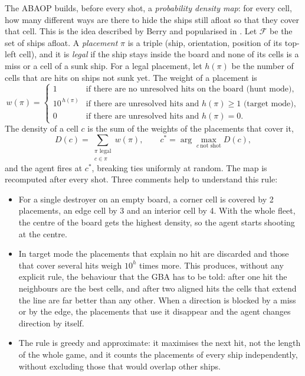 \documentclass[letterpaper,11pt]{article} %
\begin{document}
The ABAOP builds, before every shot, a \emph{probability density map}: for every cell, how many different ways are there to hide the ships still afloat so that they cover that cell.
This is the idea described by Berry \cite{berry2011} and popularised in \cite{vsauce2019,schwartz2022}.
Let $\mathcal{F}$ be the set of ships afloat. A \emph{placement} $\pi$ is a triple (ship, orientation, position of its top-left cell), and it is \emph{legal} if the ship stays inside the board and none of its cells is a miss or a cell of a sunk ship.
For a legal placement, let $h(\pi)$ be the number of cells that are hits on ships not sunk yet. The weight of a placement is
\begin{equation}
    w(\pi)=\begin{cases}
        1 & \text{if there are no unresolved hits on the board (hunt mode)},\\
        10^{\,h(\pi)} & \text{if there are unresolved hits and } h(\pi)\ge1 \text{ (target mode)},\\
        0 & \text{if there are unresolved hits and } h(\pi)=0.
    \end{cases}
\end{equation}
The density of a cell $c$ is the sum of the weights of the placements that cover it,
\begin{equation}
    D(c)=\sum_{\substack{\pi \text{ legal}\\ c\in\pi}} w(\pi),
    \qquad
    c^{*}=\arg\max_{c\ \text{not shot}} D(c),
\end{equation}
and the agent fires at $c^{*}$, breaking ties uniformly at random. The map is recomputed after every shot.
Three comments help to understand this rule:

\begin{itemize}
    \item For a single destroyer on an empty board, a corner cell is covered by 2 placements, an edge cell by 3 and an interior cell by 4. With the whole fleet, the centre of the board gets the highest density, so the agent starts shooting at the centre.
    \item In target mode the placements that explain no hit are discarded and those that cover several hits weigh $10^{h}$ times more. This produces, without any explicit rule, the behaviour that the GBA has to be told: after one hit the neighbours are the best cells, and after two aligned hits the cells that extend the line are far better than any other. When a direction is blocked by a miss or by the edge, the placements that use it disappear and the agent changes direction by itself.
    \item The rule is greedy and approximate: it maximises the next hit, not the length of the whole game, and it counts the placements of every ship independently, without excluding those that would overlap other ships.
\end{itemize}
\end{document}
